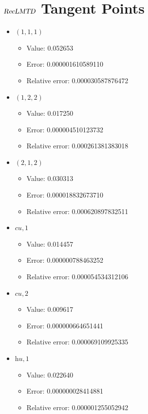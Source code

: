 \documentclass{article}%
\begin{document}
\section{$\textsl{RecLMTD}$ Tangent Points}%
\thispagestyle{plain}%
\begin{itemize}%
	\item $(1, 1, 1)$%
	\begin{itemize}%
		\item Value: 0.052653%
		\item Error: 0.000001610589110%
		\item Relative error: 0.000030587876472%
	\end{itemize}%
	\item $(1, 2, 2)$%
	\begin{itemize}%
		\item Value: 0.017250%
		\item Error: 0.000004510123732%
		\item Relative error: 0.000261381383018%
	\end{itemize}%
	\item $(2, 1, 2)$%
	\begin{itemize}%
		\item Value: 0.030313%
		\item Error: 0.000018832673710%
		\item Relative error: 0.000620897832511%
	\end{itemize}%
	\item $\textit{cu},1$%
	\begin{itemize}%
		\item Value: 0.014457%
		\item Error: 0.000000788463252%
		\item Relative error: 0.000054534312106%
	\end{itemize}%
	\item $\textit{cu},2$%
	\begin{itemize}%
		\item Value: 0.009617%
		\item Error: 0.000000664651441%
		\item Relative error: 0.000069109925335%
	\end{itemize}%
	\item $\textit{hu},1$%
	\begin{itemize}%
		\item Value: 0.022640%
		\item Error: 0.000000028414881%
		\item Relative error: 0.000001255052942%
	\end{itemize}%
\end{itemize}%
\end{document}
